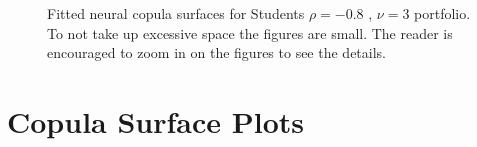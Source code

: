 \documentclass[%
a4paper,							
11pt,								
bibliography=totoc,						
abstracton=true					
]
{scrartcl}
\theoremstyle{plain}
\theoremstyle{definition}
\theoremstyle{remark}
\newcommand{\1}{\mathbbm{1}}
\begin{document}
\begin{figure}[H]
\begin{minipage}{0.49\textwidth}
    \end{minipage}
    \caption{Fitted neural copula surfaces for Students $\rho=-0.8$ , $\nu = 3$ portfolio. To not take up excessive space the figures are small. The reader is encouraged to zoom in on the figures to see the details.}
    \label{fig:GeneratedDataStudents}
\end{figure}



\newpage
\section{Copula Surface Plots}\label{sec:CopulaSurfacesPlots}
\end{document}
